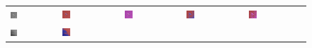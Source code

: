 \begin{figure}[h!]
	\begin{tabular}{C{0.19\textwidth}C{0.19\textwidth}C{0.19\textwidth}C{0.19\textwidth}C{0.19\textwidth}}
		\includegraphics[width=0.15\textwidth]{images/p03/p03_01.png} &
		\includegraphics[width=0.15\textwidth]{images/gen/activation_functions/p03_01.png_None.png} &
		\includegraphics[width=0.15\textwidth]{images/gen/activation_functions/p03_01.png_relu.png} &
		\includegraphics[width=0.15\textwidth]{images/gen/activation_functions/p03_01.png_sigmoid.png} &
		\includegraphics[width=0.15\textwidth]{images/gen/activation_functions/p03_01.png_tanh.png} \\
		\includegraphics[width=0.15\textwidth]{images/p03/p03_02.png} &
		\includegraphics[width=0.15\textwidth]{images/gen/activation_functions/p03_02.png_None.png} &

\end{tabular}
\end{figure}
